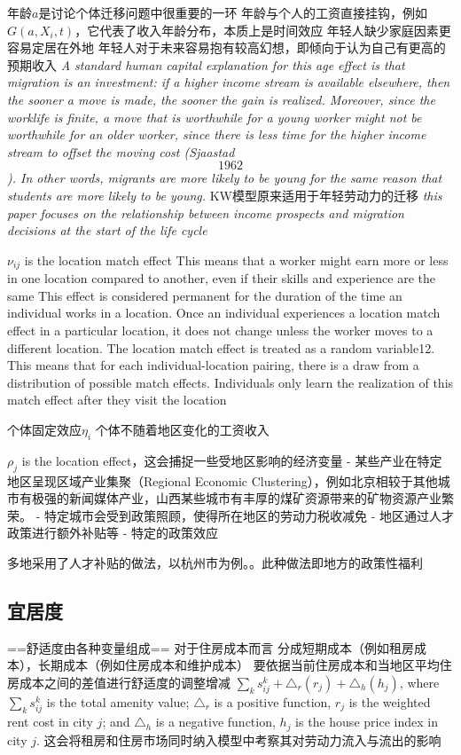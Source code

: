 \documentclass[10pt,a4paper]{article}
\begin{document}
年龄$a$是讨论个体迁移问题中很重要的一环
年龄与个人的工资直接挂钩，例如$G(a,X_i,t)$，它代表了收入年龄分布，本质上是时间效应
年轻人缺少家庭因素更容易定居在外地
年轻人对于未来容易抱有较高幻想，即倾向于认为自己有更高的预期收入
\textit{A standard human capital explanation for this age effect is that migration is an investment: if a higher income stream is  available elsewhere, then the sooner a move is made, the sooner the gain is realized. Moreover,  since the worklife is finite, a move that is worthwhile for a young worker might not be  worthwhile for an older worker, since there is less time for the higher income stream to offset  the moving cost (Sjaastad \[1962\]). In other words, migrants are more likely to be young for the same reason that students are more likely to be young.}
KW模型原来适用于年轻劳动力的迁移
\textit{this paper focuses on the relationship between income prospects and migration decisions at the start of the life cycle}




$\nu_{ij}$ is the location match effect
This means that a worker might earn more or less in one location compared to another, even if their skills and experience are the same
This effect is considered permanent for the duration of the time an individual works in a location. Once an individual experiences a location match effect in a particular location, it does not change unless the worker moves to a different location.
The location match effect is treated as a random variable12. This means that for each individual-location pairing, there is a draw from a distribution of possible match effects. Individuals only learn the realization of this match effect after they visit the location



个体固定效应$\eta_i$
个体不随着地区变化的工资收入



$\rho_j$ is the location effect，这会捕捉一些受地区影响的经济变量
- 某些产业在特定地区呈现区域产业集聚（Regional Economic Clustering），例如北京相较于其他城市有极强的新闻媒体产业，山西某些城市有丰厚的煤矿资源带来的矿物资源产业繁荣。
- 特定城市会受到政策照顾，使得所在地区的劳动力税收减免
- 地区通过人才政策进行额外补贴等
- 特定的政策效应

多地采用了人才补贴的做法，以杭州市为例。。此种做法即地方的政策性福利

\subsection{宜居度}
==舒适度由各种变量组成==
对于住房成本而言
分成短期成本（例如租房成本），长期成本（例如住房成本和维护成本）
要依据当前住房成本和当地区平均住房成本之间的差值进行舒适度的调整增减
$\sum\limits_{k}s^k_{ij}+\triangle_r(r_j)+\triangle_h(h_j)$, where $\sum\limits_{k}s^k_{ij}$ is the total amenity value; $\triangle_r$ is a positive function, $r_j$ is the weighted rent cost in city $j$; and $\triangle_h$ is a negative function, $h_j$ is the house price index in city $j$.
这会将租房和住房市场同时纳入模型中考察其对劳动力流入与流出的影响
\end{document}
